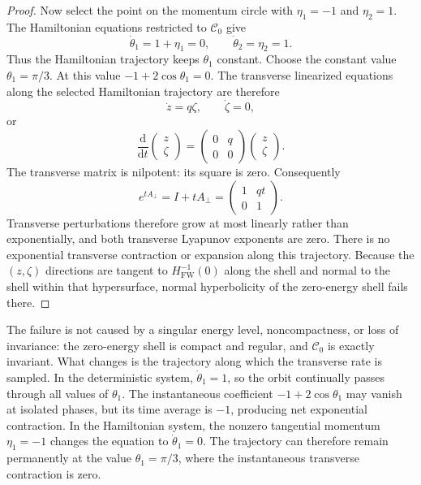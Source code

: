 \documentclass[11pt]{article}
\theoremstyle{definition}
\theoremstyle{remark}
\newcommand{\C}{\mathcal{C}}
\newcommand{\Hs}{H_{\mathrm{FW}}}
\newcommand{\dd}{\mathrm{d}}
\begin{document}
\begin{proof}
Now select the point on the momentum circle with $\eta_1=-1$ and $\eta_2=1$.  The Hamiltonian equations restricted to $\C_0$ give
\[
\dot\theta_1=1+\eta_1=0,
\qquad
\dot\theta_2=\eta_2=1.
\]
Thus the Hamiltonian trajectory keeps $\theta_1$ constant.  Choose the constant value $\theta_1=\pi/3$.  At this value $-1+2\cos\theta_1=0$.  The transverse linearized equations along the selected Hamiltonian trajectory are therefore
\begin{equation}
\dot z=q\zeta,
\qquad
\dot\zeta=0,
\label{eq:nilpotent-transverse}
\end{equation}
or
\[
\frac{\dd}{\dd t}\begin{pmatrix}z\\ \zeta\end{pmatrix}
=
\begin{pmatrix}0&q\\0&0\end{pmatrix}
\begin{pmatrix}z\\ \zeta\end{pmatrix}.
\]
The transverse matrix is nilpotent: its square is zero.  Consequently
\[
e^{tA_\perp}=I+tA_\perp
=
\begin{pmatrix}1&qt\\0&1\end{pmatrix}.
\]
Transverse perturbations therefore grow at most linearly rather than exponentially, and both transverse Lyapunov exponents are zero.  There is no exponential transverse contraction or expansion along this trajectory.  Because the $(z,\zeta)$ directions are tangent to $\Hs^{-1}(0)$ along the shell and normal to the shell within that hypersurface, normal hyperbolicity of the zero-energy shell fails there.
\end{proof}

The failure is not caused by a singular energy level, noncompactness, or loss of invariance: the zero-energy shell is compact and regular, and $\C_0$ is exactly invariant.  What changes is the trajectory along which the transverse rate is sampled.  In the deterministic system, $\dot\theta_1=1$, so the orbit continually passes through all values of $\theta_1$.  The instantaneous coefficient $-1+2\cos\theta_1$ may vanish at isolated phases, but its time average is $-1$, producing net exponential contraction.  In the Hamiltonian system, the nonzero tangential momentum $\eta_1=-1$ changes the equation to $\dot\theta_1=0$.  The trajectory can therefore remain permanently at the value $\theta_1=\pi/3$, where the instantaneous transverse contraction is zero.
\end{document}
